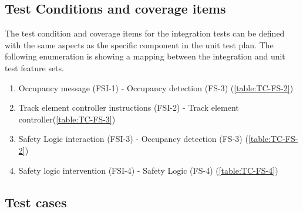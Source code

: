 
\subsection{Test Conditions and coverage items}
The test condition and coverage items for the integration tests can be defined with the same aspects as the specific component in the unit test plan.
The following enumeration is showing a mapping between the integration and unit test feature sets.
\begin{enumerate}
	\item Occupancy message (FSI-1) - Occupancy detection (FS-3) (\ref{table:TC-FS-2})
	\item Track element controller instructions (FSI-2) - Track element controller(\ref{table:TC-FS-3})
	\item Safety Logic interaction (FSI-3) - Occupancy detection (FS-3) (\ref{table:TC-FS-2})
	\item Safety logic intervention (FSI-4) - Safety Logic (FS-4) (\ref{table:TC-FS-4})
\end{enumerate}

\subsection{Test cases}

